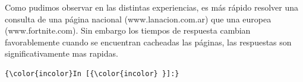 \documentclass[12pt]{extarticle}
\begin{document}
Como pudimos observar en las distintas experiencias, es más rápido
resolver una consulta de una página nacional (www.lanacion.com.ar) que
una europea (www.fortnite.com). Sin embargo los tiempos de respuesta
cambian favorablemente cuando se encuentran cacheadas las páginas, las
respuestas son significativamente mas rapidas.

    

    \begin{Verbatim}[commandchars=\\\{\}]
{\color{incolor}In [{\color{incolor} }]:} 
\end{Verbatim}


    
    



    
    
\end{document}
